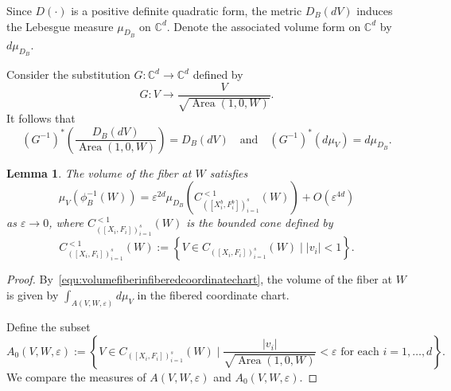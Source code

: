 \documentclass{compositio}
\numberwithin{equation}{section}
\numberwithin{figure}{section}
\theoremstyle{definition}
\theoremstyle{plain}
\newtheorem{lemma}[definition]{Lemma}
\begin{document}
{Since $D(\cdot)$ is a positive definite quadratic form, the metric $D_B(dV)$ induces the Lebesgue measure $\mu_{D_B}$ on $\mathbb{C}^d$. Denote the associated volume form on $\mathbb{C}^d$ by $d\mu_{D_B}$.

Consider the substitution $G:\mathbb{C}^d\to\mathbb{C}^d$ defined by
\begin{equation}\label{equ:substitution}
    G:V \to \frac{V}{\sqrt{\operatorname{Area}(1,0,W)}}.
\end{equation}
It follows that
$$
(G^{-1})^{\ast}\left(\frac{D_B(dV)}{\operatorname{Area}(1, 0, W)}\right) = D_B(dV) \quad \text{and} \quad (G^{-1})^{\ast}(d\mu_V) = d\mu_{D_B}.
$$

\begin{lemma}\label{lem:volumeoffiber}
The volume of the fiber at $W$ satisfies
\begin{equation}\label{equ:asymvolumeoffibers}
    \mu_V\left(\phi_B^{-1}(W)\right) = \varepsilon^{2d} \mu_{D_B}\left(C^{< 1}_{([X^b_i, F^b_i])_{i=1}^s}(W)\right) + O(\varepsilon^{4d})
\end{equation}
as $\varepsilon\to 0$, where $C^{< 1}_{([X_i, F_i])_{i=1}^s}(W)$ is the bounded cone defined by
$$
C^{< 1}_{([X_i, F_i])_{i=1}^s}(W) := \left\{V\in C_{([X_i, F_i])_{i=1}^s}(W) \mid |v_i| < 1  \right\}.
$$
\end{lemma}

\begin{proof}
By~\eqref{equ:volumefiberinfiberedcoordinatechart}, the volume of the fiber at $W$ is given by $\int_{A(V,W,\varepsilon)} d\mu_V$ in the fibered coordinate chart.

Define the subset
$$
A_0(V,W,\varepsilon):=\left\{V \in C_{([X_i, F_i])_{i=1}^s}(W) \mid \frac{|v_{i}|}{\sqrt{\operatorname{Area}(1, 0, W)}}<\varepsilon\text{ for each }i=1,\dots,d\right\}.
$$
We compare the measures of $A(V,W,\varepsilon)$ and $A_0(V,W,\varepsilon)$.


\end{proof}}
\end{document}
